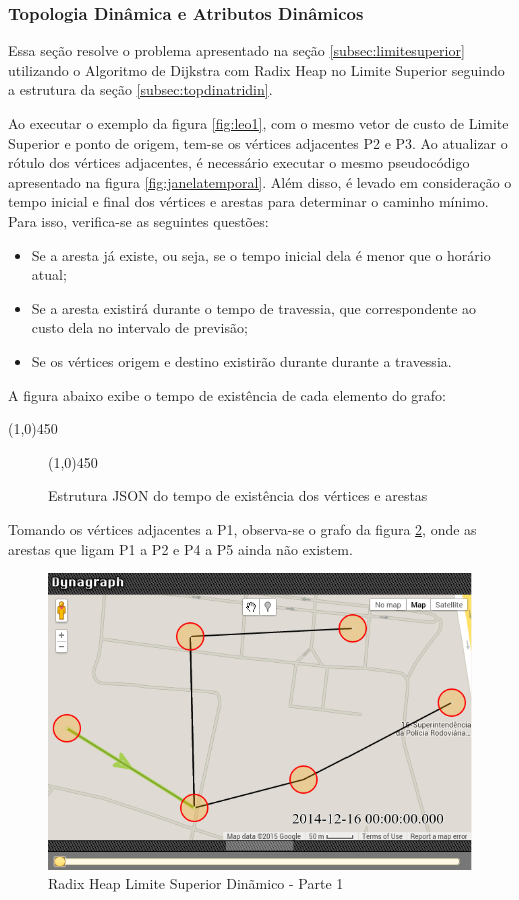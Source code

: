 \subsubsection{Topologia Dinâmica e Atributos Dinâmicos}
Essa seção resolve o problema apresentado na seção \ref{subsec:limitesuperior} utilizando o Algoritmo de
Dijkstra com Radix Heap no Limite Superior seguindo a estrutura da seção \ref{subsec:topdinatridin}.

Ao executar o exemplo da figura \ref{fig:leo1}, com o mesmo vetor de custo de Limite Superior e ponto de origem, tem-se
os vértices adjacentes P2 e P3. Ao atualizar o rótulo dos vértices adjacentes, é necessário executar o mesmo
pseudocódigo apresentado na figura \ref{fig:janelatemporal}. Além disso, é levado em consideração o tempo
inicial e final dos vértices e arestas para determinar o caminho mínimo. Para isso,
verifica-se as seguintes questões:
\begin{itemize}
\item Se a aresta já existe, ou seja, se o tempo inicial dela é menor que o horário atual;
\item Se a aresta existirá durante o tempo de travessia, que correspondente ao custo dela no intervalo de previsão;
\item Se os vértices origem e destino existirão durante durante a travessia.
\end{itemize}
\FloatBarrier

A figura abaixo exibe o tempo de existência de cada elemento do grafo:
\begin{center}
  \line(1,0){450}
\end{center}

\begin{figure}[htbp]
  \begin{center}
    \line(1,0){450}
  \end{center}
  \centering
  \caption{Estrutura JSON do tempo de existência dos vértices e arestas}
  \label{fig:datatime}
\end{figure}
\FloatBarrier

Tomando os vértices adjacentes a P1, observa-se o grafo da figura \ref{fig:dyndyn1}, onde as arestas
que ligam P1 a P2 e P4 a P5 ainda não existem.

\begin{figure}[htbp]
\centering
 \includegraphics[width=.55\textwidth]{chapters/fig/dyndyn1.png}
\caption{Radix Heap Limite Superior Dinãmico - Parte 1}
\label{fig:dyndyn1}
\end{figure}
\FloatBarrier

